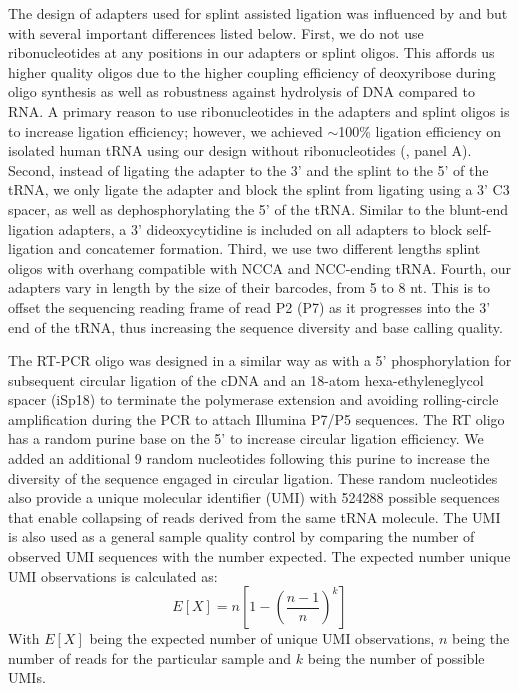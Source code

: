 \documentclass[9pt,lineno]{elife}
\begin{document}
The design of adapters used for splint assisted ligation was influenced by \cite{Smith2015-ht} and \cite{Shigematsu2017-tv} but with several important differences listed below.
First, we do not use ribonucleotides at any positions in our adapters or splint oligos.
This affords us higher quality oligos due to the higher coupling efficiency of deoxyribose during oligo synthesis as well as robustness against hydrolysis of DNA compared to RNA.
A primary reason to use ribonucleotides in the adapters and splint oligos is to increase ligation efficiency; however, we achieved $\sim$100\% ligation efficiency on isolated human tRNA using our design without ribonucleotides (, panel A).
Second, instead of ligating the adapter to the 3’ and the splint to the 5’ of the tRNA, we only ligate the adapter and block the splint from ligating using a 3’ C3 spacer, as well as dephosphorylating the 5’ of the tRNA.
Similar to the blunt-end ligation adapters, a 3’ dideoxycytidine is included on all adapters to block self-ligation and concatemer formation.
Third, we use two different lengths splint oligos with overhang compatible with NCCA and NCC-ending tRNA.
Fourth, our adapters vary in length by the size of their barcodes, from 5 to 8 nt.
This is to offset the sequencing reading frame of read P2 (P7) as it progresses into the 3’ end of the tRNA, thus increasing the sequence diversity and base calling quality.

The RT-PCR oligo was designed in a similar way as \cite{McGlincy2017-ro} with a 5’ phosphorylation for subsequent circular ligation of the cDNA and an 18-atom hexa-ethyleneglycol spacer (iSp18) to terminate the polymerase extension and avoiding rolling-circle amplification during the PCR to attach Illumina P7/P5 sequences.
The RT oligo has a random purine base on the 5’ to increase circular ligation efficiency.
We added an additional 9 random nucleotides following this purine to increase the diversity of the sequence engaged in circular ligation.
These random nucleotides also provide a unique molecular identifier (UMI) with 524288 possible sequences that enable collapsing of reads derived from the same tRNA molecule.
The UMI is also used as a general sample quality control by comparing the number of observed UMI sequences with the number expected.
The expected number unique UMI observations is calculated as:
\begin{equation}
E[X] = n \left[ 1 - \left(\frac{n-1}{n} \right)^k \right]
\end{equation}
With $E[X]$ being the expected number of unique UMI observations, $n$ being the number of reads for the particular sample and $k$ being the number of possible UMIs.
\end{document}

